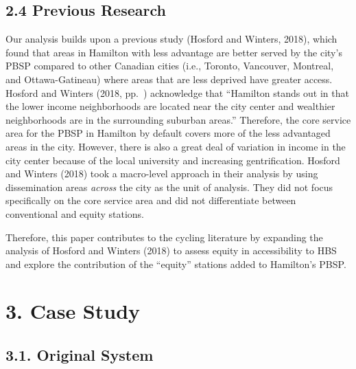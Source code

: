 \documentclass[]{elsarticle} %
\begin{document}
\hypertarget{previous-research}{%
\subsection{2.4 Previous Research}\label{previous-research}}

Our analysis builds upon a previous study (Hosford and Winters, 2018),
which found that areas in Hamilton with less advantage are better served
by the city's PBSP compared to other Canadian cities (i.e., Toronto,
Vancouver, Montreal, and Ottawa-Gatineau) where areas that are less
deprived have greater access. Hosford and Winters (2018, pp.~)
acknowledge that ``Hamilton stands out in that the lower income
neighborhoods are located near the city center and wealthier
neighborhoods are in the surrounding suburban areas.'' Therefore, the
core service area for the PBSP in Hamilton by default covers more of the
less advantaged areas in the city. However, there is also a great deal
of variation in income in the city center because of the local
university and increasing gentrification. Hosford and Winters (2018)
took a macro-level approach in their analysis by using dissemination
areas \emph{across} the city as the unit of analysis. They did not focus
specifically on the core service area and did not differentiate between
conventional and equity stations.

Therefore, this paper contributes to the cycling literature by expanding
the analysis of Hosford and Winters (2018) to assess equity in
accessibility to HBS and explore the contribution of the ``equity''
stations added to Hamilton's PBSP.

\hypertarget{sec:study}{%
\section{3. Case Study}\label{sec:study}}

\hypertarget{original-system}{%
\subsection{3.1. Original System}\label{original-system}}
\end{document}
